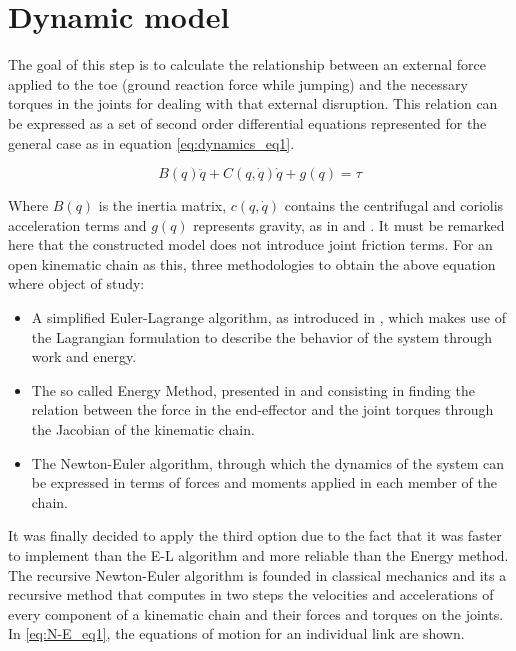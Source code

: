 \section{Dynamic model}
\label{sec_dynamic_model}
The goal of this step is to calculate the relationship between an external force applied to the toe (ground reaction force while jumping) and the necessary torques in the joints for dealing with that external disruption.
This relation can be expressed as a set of second order differential equations represented for the general case as in equation \ref{eq:dynamics_eq1}. 

\begin{equation}
	\label{eq:dynamics_eq1}
	B(q)\ddot{q} + C(q,\dot{q})\dot{q} + g(q) = \tau
\end{equation}

Where $B(q)$ is the inertia matrix, $c(q,\dot{q})$ contains the centrifugal and coriolis acceleration terms and $g(q)$ represents gravity, as in \cite{dynamics1} and \cite{dynamics2}. 
It must be remarked here that the constructed model does not introduce joint friction terms.
For an open kinematic chain as this, three methodologies to obtain the above equation where object of study:

\begin{itemize}
	\item A simplified Euler-Lagrange algorithm, as introduced in \cite{E-L1}, which makes use of the Lagrangian formulation to describe the behavior of the system through work and energy.
	\item The so called Energy Method, presented in \cite{asada} and consisting in finding the relation between the force in the end-effector and the joint torques through the Jacobian of the kinematic chain.
	\item The Newton-Euler algorithm, through which the dynamics of the system can be expressed in terms of forces and moments applied in each member of the chain.
\end{itemize}

It was finally decided to apply the third option due to the fact that it was faster to implement than the E-L algorithm and more reliable than the Energy method.
The recursive Newton-Euler algorithm is founded in classical mechanics and its a recursive method that computes in two steps the velocities and accelerations of every component of a kinematic chain and their forces and torques on the joints.
In \ref{eq:N-E_eq1}, the equations of motion for an individual link are shown.

